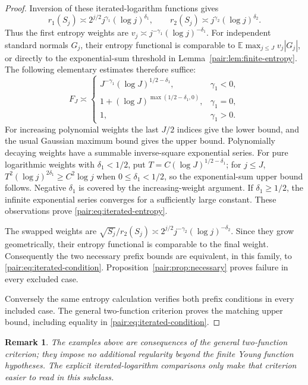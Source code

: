\documentclass[11pt]{article}
\newtheorem{remark}[theorem]{Remark}
\newcommand{\E}{\mathbb E}
\numberwithin{equation}{section}
\begin{document}
\begin{proof}
Inversion of these iterated-logarithm functions gives
\[
 r_1(S_j)\asymp2^{j/2}j^{\gamma_1}(\log j)^{\delta_1},\qquad
 r_2(S_j)\asymp j^{\gamma_2}(\log j)^{\delta_2}.
\]
Thus the first entropy weights are
\(v_j\asymp j^{-\gamma_1}(\log j)^{-\delta_1}\).
For independent standard normals \(G_j\), their entropy functional
is comparable to \(\E\max_{j\le J}v_j|G_j|\), or directly to
the exponential-sum threshold in
Lemma~\ref{pair:lem:finite-entropy}.  The following elementary
estimates therefore suffice:
\[
 F_J\asymp
 \begin{cases}
 J^{-\gamma_1}(\log J)^{1/2-\delta_1},&\gamma_1<0,\\
 1+(\log J)^{\max(1/2-\delta_1,0)},&\gamma_1=0,\\
 1,&\gamma_1>0.
 \end{cases}
 \tag{P12}\label{pair:eq:iterated-entropy}
\]
For increasing polynomial weights the last \(J/2\) indices give the
lower bound, and the usual Gaussian maximum bound gives the upper
bound.  Polynomially decaying weights have a summable inverse-square
exponential series.  For pure logarithmic weights with
\(\delta_1<1/2\), put
\(T=C(\log J)^{1/2-\delta_1}\); for \(j\le J\),
\(T^2(\log j)^{2\delta_1}\ge C^2\log j\) when
\(0\le\delta_1<1/2\), so the exponential-sum upper bound follows.
Negative \(\delta_1\) is covered by the increasing-weight argument.
If \(\delta_1\ge1/2\), the infinite exponential series converges
for a sufficiently large constant.  These observations prove
\eqref{pair:eq:iterated-entropy}.

The swapped weights are
\(\sqrt{S_j}/r_2(S_j)\asymp
2^{j/2}j^{-\gamma_2}(\log j)^{-\delta_2}\).
Since they grow geometrically, their entropy functional is comparable
to the final weight.  Consequently the two necessary prefix bounds
are equivalent, in this family, to \eqref{pair:eq:iterated-condition}.
Proposition~\ref{pair:prop:necessary} proves failure in every excluded
case.

Conversely the same entropy calculation verifies both prefix conditions
in every included case. The general two-function criterion proves the
matching upper bound, including equality in
\eqref{pair:eq:iterated-condition}.
\end{proof}

\begin{remark}
The examples above are consequences of the general two-function
criterion; they impose no additional regularity beyond the finite Young
function hypotheses. The explicit iterated-logarithm comparisons only
make that criterion easier to read in this subclass.
\end{remark}
\end{document}
